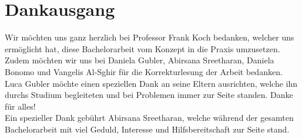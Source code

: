 \section{Dankausgang}
Wir möchten uns ganz herzlich bei Professor Frank Koch bedanken, welcher uns ermöglicht hat, diese Bachelorarbeit vom Konzept in die Praxis umzusetzen. \\

Zudem möchten wir uns bei Daniela Gubler, Abirsana Sreetharan, Daniela Bonomo und Vangelis Al-Sghir für die Korrekturlesung der Arbeit bedanken. \\


Luca Gubler möchte einen speziellen Dank an seine Eltern ausrichten, welche ihn durchs Studium begleiteten und bei Problemen immer zur Seite standen. Danke für alles!\\
Ein spezieller Dank gebührt Abirsana Sreetharan, welche während der gesamten Bachelorarbeit mit viel Geduld, Interesse und Hilfsbereitschaft zur Seite stand.